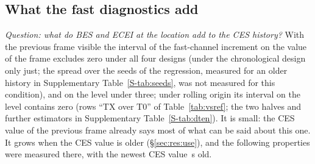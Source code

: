\documentclass[11pt,a4paper]{article}
\newcommand{\SuppTab}[1]{Supplementary Table~\ref{S-#1}}
\begin{document}
\subsection{What the fast diagnostics add}
\label{sec:res:fast}

\emph{Question: what do BES and ECEI at the location add to the CES history?} With the
previous frame visible the interval of the fast-channel increment on the value of the frame excludes zero under
all four designs (under the chronological design only just; the spread over the seeds of
the regression, measured for an older history in \SuppTab{tab:seeds}, was not measured
for this condition), and on the level under three; under rolling origin its interval on
the level contains zero (rows ``TX over T0'' of Table~\ref{tab:vsref};
the two halves and further estimators in \SuppTab{tab:dten}). It is small: the CES value
of the previous frame already says most of what can be said about this one. It grows
when the CES value is older (\S\ref{sec:res:use}), and the following properties were
measured there, with the newest CES value \AgeMedianS\,s old.
\end{document}
